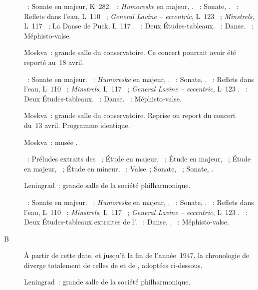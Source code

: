 \begin{description}
 \textsc{\Mozart{}}~: Sonate en \kE \Flat majeur, K~282.
 \textsc{\Schumann{}}~: \emph{Humoreske} en \kB \Flat majeur, .
 \textsc{\Scriabine{}}~: Sonate, .
 \textsc{\Debussy{}}~: Reflets dans l'eau, L~110 ~; \emph{General
 Lavine -- eccentric}, L~123 ~; \emph{Minstrels}, L~117
 ~; La Danse de Puck, L~117 .
 \textsc{\Rachmaninov{}}~: Deux Études-tableaux.
 \textsc{\Prokofiev{}}~: Danse.
 \textsc{\Liszt{}}~: Méphisto-valse.
 \item[\DateWithWeekDay{1947-04-13}]
 Moskva~: grande salle du conservatoire.
 Ce concert pourrait avoir été reporté au~18 avril.

 \textsc{\Mozart{}}~: Sonate en \kB \Flat majeur.
 \textsc{\Schumann{}}~: \emph{Humoreske} en \kB \Flat majeur, .
 \textsc{\Scriabine{}}~: Sonate, .
 \textsc{\Debussy{}}~: Reflets dans l'eau, L~110 ~;
 \emph{Minstrels}, L~117 ~; \emph{General Lavine -- eccentric},
 L~123 .
 \textsc{\Rachmaninov{}}~: Deux Études-tableaux.
 \textsc{\Prokofiev{}}~: Danse.
 \textsc{\Liszt{}}~: Méphisto-valse.
 \item[\DateWithWeekDay{1947-04-18}]
 Moskva~: grande salle du conservatoire.
 Reprise ou report du concert du~13 avril.
 Programme identique.
 \item[\DateWithWeekDay{1947-04-20}]
 Moskva~: musée \Scriabine{}.

 \textsc{\Scriabine{}}~: Préludes extraits des ~;
 Étude en \kB majeur,  ~; Étude en \kE majeur, 
 ~; Étude en \kA \Flat majeur,  ~; Étude en \kG
 \Sharp mineur,  ~; Valse~; Sonate, ~; Sonate,
 .
 \item[\DateWithWeekDay{1947-04-24}]
 Leningrad~: grande salle de la société philharmonique.

 \textsc{\Mozart{}}~: Sonate en \kB \Flat majeur.
 \textsc{\Schumann{}}~: \emph{Humoreske} en \kB \Flat majeur, .
 \textsc{\Scriabine{}}~: Sonate, .
 \textsc{\Debussy{}}~: Reflets dans l'eau, L~110 ~;
 \emph{Minstrels}, L~117 ~; \emph{General Lavine -- eccentric},
 L~123 .
 \textsc{\Rachmaninov{}}~: Deux Études-tableaux extraites de l'.
 \textsc{\Prokofiev{}}~: Danse,  .
 \textsc{\Liszt{}}~: Méphisto-valse.
 \item[B\DateWithWeekDay{1947-04-26}]
 À partir de cette date, et jusqu'à la fin de l'année~1947, la chronologie
 de \citet[p.~168]{Nekrasova08} diverge totalement de celles de
 \citet[p.~460]{Milshteyn82a} et de \citet[p.~426-428]{Scriabine}, adoptées
 ci-dessous.
 \item[\DateWithWeekDay{1947-04-28}]
 Leningrad~: grande salle de la société philharmonique.


\end{description}
